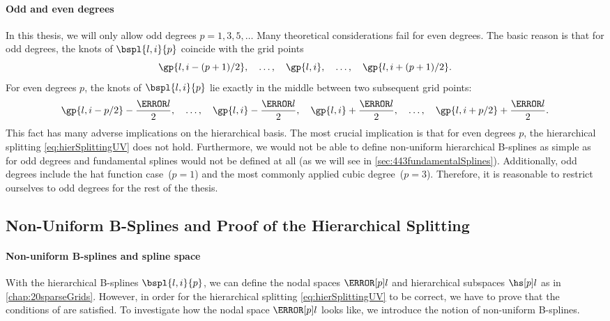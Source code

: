 \paragraph{Odd and even degrees}

In this thesis, we will only allow odd degrees $p = 1, 3, 5, \dotsc$
Many theoretical considerations fail for even degrees.
The basic reason is that for odd degrees, the knots of
$\bspl{l,i}{p}$ coincide with the grid points \cite{Valentin14Hierarchische}
\begin{equation}
  \gp{l,i-(p+1)/2},\quad
  \dotsc,\quad
  \gp{l,i},\quad
  \dotsc,\quad
  \gp{l,i+(p+1)/2}.
\end{equation}
For even degrees $p$, the knots of $\bspl{l,i}{p}$ lie exactly in
the middle between two subsequent grid points:
\begin{equation}
  \gp{l,i-p/2} - \frac{\ms{l}}{2},\quad
  \dotsc,\quad
  \gp{l,i} - \frac{\ms{l}}{2},\quad
  \gp{l,i} + \frac{\ms{l}}{2},\quad
  \dotsc,\quad
  \gp{l,i+p/2} + \frac{\ms{l}}{2}.
\end{equation}
This fact has many adverse implications on the hierarchical basis.
The most crucial implication is
that for even degrees $p$,
the hierarchical splitting \eqref{eq:hierSplittingUV} does not hold.
Furthermore,
we would not be able to define non-uniform hierarchical B-splines as
simple as for odd degrees and
fundamental splines would not be defined at all
(as we will see in \cref{sec:443fundamentalSplines}).
Additionally,
odd degrees include the hat function case~($p = 1$) and the
most commonly applied cubic degree~($p = 3$).
Therefore,
it is reasonable to restrict ourselves to odd degrees
for the rest of the thesis.



\subsection{Non-Uniform B-Splines and Proof of the Hierarchical Splitting}
\label{sec:312proofHierarchicalSplitting}

\paragraph{Non-uniform B-splines and spline space}

With the hierarchical B-splines $\bspl{l,i}{p}$, we can define
the nodal spaces $\nsbspl{l}{p}$ and hierarchical subspaces $\hsbspl{l}{p}$
as in \cref{chap:20sparseGrids}.
However, in order for the hierarchical splitting \eqref{eq:hierSplittingUV}
to be correct, we have to prove that the conditions of
 are satisfied.
To investigate how the nodal space $\nsbspl{l}{p}$ looks like,
we introduce the notion of non-uniform B-splines.

